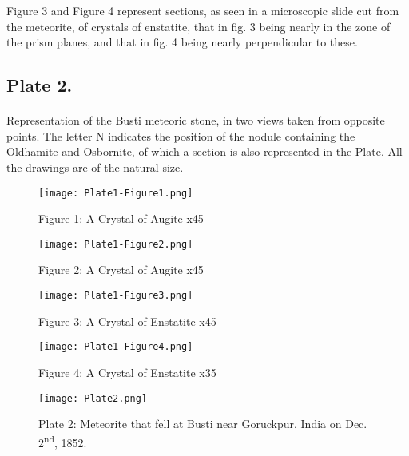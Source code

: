 \documentclass[a4paper, 12pt, oneside]{article}
\begin{document}
Figure 3 and Figure 4 represent sections, as seen in a microscopic slide cut from the meteorite, of crystals of enstatite, that in fig. 3 being nearly in the zone of the prism planes, and that in fig. 4 being nearly perpendicular to these.
\subsection{Plate 2.}
\paragraph{}
Representation of the Busti meteoric stone, in two views taken from opposite points. The letter N indicates the position of the nodule containing the Oldhamite and Osbornite, of which a section is also represented in the Plate. All the drawings are of the natural size.
\clearpage
\pagestyle{fancy}
\fancyhf{}
\cfoot{\thepage}
\begin{figure}[H]
\centering
\texttt{[image: Plate1-Figure1.png]}
\caption{\small Figure 1: A Crystal of Augite x45}
\end{figure}
\clearpage
\begin{figure}[H]
\centering
\texttt{[image: Plate1-Figure2.png]}
\caption{\small Figure 2: A Crystal of Augite x45}
\end{figure}
\clearpage
\begin{figure}[H]
\centering
\texttt{[image: Plate1-Figure3.png]}
\caption{\small Figure 3: A Crystal of Enstatite x45}
\end{figure}
\clearpage
\begin{figure}[H]
\centering
\texttt{[image: Plate1-Figure4.png]}
\caption{\small Figure 4: A Crystal of Enstatite x35}
\end{figure}
\clearpage
{}
\begin{figure}[H]
\centering
\texttt{[image: Plate2.png]}
\caption{\small Plate 2: Meteorite that fell at Busti near Goruckpur, India on Dec. 2\textsuperscript{nd}, 1852.}
\end{figure}
\end{document}
